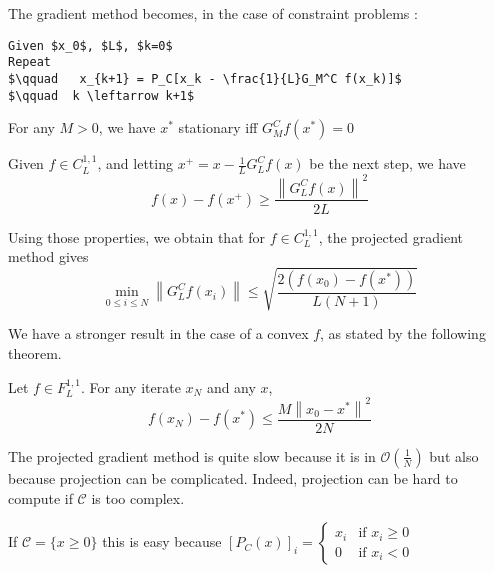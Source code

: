 
The gradient method becomes, in the case of constraint problems :

\begin{lstlisting}[mathescape,caption=Gradient Method - Constrained Problem]
Given $x_0$, $L$, $k=0$
Repeat
$\qquad   x_{k+1} = P_C[x_k - \frac{1}{L}G_M^C f(x_k)]$
$\qquad  k \leftarrow k+1$
\end{lstlisting}


\begin{property}
For any $M>0$, we have $x^*$ stationary iff $G_M^C f(x^*)=0$
\end{property}

\begin{property}
Given $f \in C^{1,1}_L$, and letting $x^+ = x - \frac{1}{L}G^C_L f(x)$ be the next step, we have
\[
    f(x) - f(x^+) \ge \frac{\left\|G_L^C f(x)\right\|^2}{2L}
\]
\end{property}


\begin{theorem} Using those properties, we obtain that for $f \in C_L^{1,1}$, the projected gradient method gives
\begin{equation*}
\min_{0\leq i \leq N} \left\|G_L^C f(x_i)\right\| \leq \sqrt{\frac{2(f(x_0) - f(x^*))}{L(N+1)}}
\end{equation*}
\end{theorem}

We have a stronger result in the case of a convex $f$, as stated by the following theorem.
\begin{theorem}
Let $f \in F_L^{1,1}$. For any iterate $x_N$ and any $x$,
\begin{equation*}
f(x_N) - f(x^*) \leq \frac{M\left\|x_0 - x^*\right\|^2}{2N}
\end{equation*}
\end{theorem}


The projected gradient method is quite slow because it is in $\mathcal{O}(\frac{1}{N})$ but also because projection can be complicated. Indeed, projection can be hard to compute if $\mathcal{C}$ is too complex.

\begin{example}
\begin{leftbar}
If $\mathcal{C}=\{x\ge0\}$ this is easy because $[P_C(x)]_i=\left\lbrace
\begin{array}{ll}
x_i & \mbox{if $x_i \ge 0$}\\
0 & \mbox{if $x_i < 0$}
\end{array}
\right.$
\end{leftbar}
\end{example}


